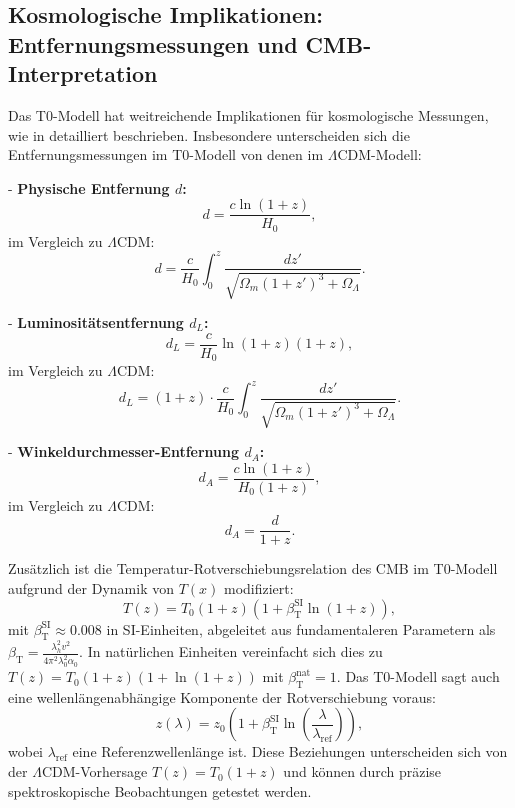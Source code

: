 \documentclass[12pt,a4paper]{article}
\newcommand{\Tfield}{T(x)}
\newcommand{\betaT}{\beta_{\text{T}}}
\begin{document}
	\subsection{Kosmologische Implikationen: Entfernungsmessungen und CMB-Interpretation}
	Das T0-Modell hat weitreichende Implikationen für kosmologische Messungen, wie in \cite{pascher_messdifferenzen_2025} detailliert beschrieben. Insbesondere unterscheiden sich die Entfernungsmessungen im T0-Modell von denen im \(\Lambda\)CDM-Modell:
	
	- \textbf{Physische Entfernung \( d \):}
	\[
	d = \frac{c \ln(1 + z)}{H_0},
	\]
	im Vergleich zu \(\Lambda\)CDM:
	\[
	d = \frac{c}{H_0} \int_0^z \frac{dz'}{\sqrt{\Omega_m (1 + z')^3 + \Omega_\Lambda}}.
	\]
	
	- \textbf{Luminositätsentfernung \( d_L \):}
	\[
	d_L = \frac{c}{H_0} \ln(1 + z) (1 + z),
	\]
	im Vergleich zu \(\Lambda\)CDM:
	\[
	d_L = (1 + z) \cdot \frac{c}{H_0} \int_0^z \frac{dz'}{\sqrt{\Omega_m (1 + z')^3 + \Omega_\Lambda}}.
	\]
	
	- \textbf{Winkeldurchmesser-Entfernung \( d_A \):}
	\[
	d_A = \frac{c \ln(1 + z)}{H_0 (1 + z)},
	\]
	im Vergleich zu \(\Lambda\)CDM:
	\[
	d_A = \frac{d}{1 + z}.
	\]
	
	Zusätzlich ist die Temperatur-Rotverschiebungsrelation des CMB im T0-Modell aufgrund der Dynamik von \( \Tfield \) modifiziert:
	\begin{equation}
		T(z) = T_0 (1 + z) (1 + \betaT^{\text{SI}} \ln(1 + z)),
	\end{equation}
	mit \(\betaT^{\text{SI}} \approx 0.008\) in SI-Einheiten, abgeleitet aus fundamentaleren Parametern als \(\betaT = \frac{\lambda_h^2 v^2}{4\pi^2 \lambda_0^2 \alpha_0}\). In natürlichen Einheiten vereinfacht sich dies zu \( T(z) = T_0 (1 + z) (1 + \ln(1 + z)) \) mit \(\betaT^{\text{nat}} = 1\). Das T0-Modell sagt auch eine wellenlängenabhängige Komponente der Rotverschiebung voraus:
	\begin{equation}
		z(\lambda) = z_0 \left(1 + \betaT^{\text{SI}} \ln\left(\frac{\lambda}{\lambda_{\text{ref}}}\right)\right),
	\end{equation}
	wobei \(\lambda_{\text{ref}}\) eine Referenzwellenlänge ist. Diese Beziehungen unterscheiden sich von der \(\Lambda\)CDM-Vorhersage \( T(z) = T_0 (1 + z) \) und können durch präzise spektroskopische Beobachtungen getestet werden.
	
\end{document}
